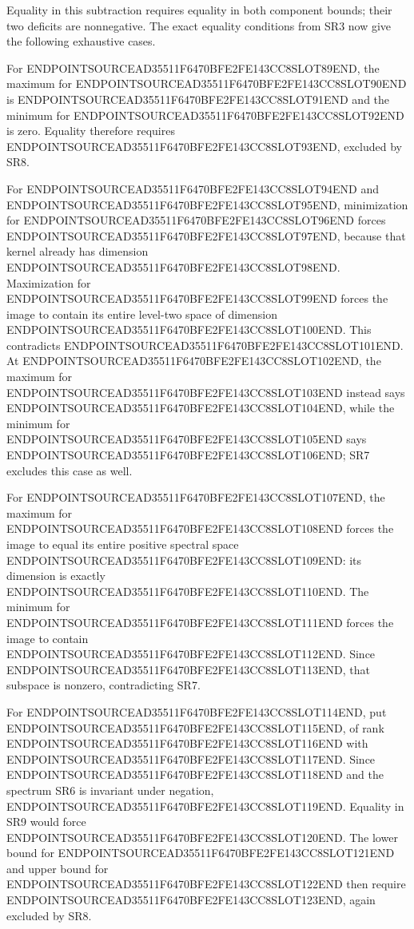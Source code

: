 Equality in this subtraction requires equality in both component bounds; their two deficits are nonnegative. The exact equality conditions from SR3 now give the following exhaustive cases.

For ENDPOINTSOURCEAD35511F6470BFE2FE143CC8SLOT89END, the maximum for ENDPOINTSOURCEAD35511F6470BFE2FE143CC8SLOT90END is ENDPOINTSOURCEAD35511F6470BFE2FE143CC8SLOT91END and the minimum for ENDPOINTSOURCEAD35511F6470BFE2FE143CC8SLOT92END is zero. Equality therefore requires ENDPOINTSOURCEAD35511F6470BFE2FE143CC8SLOT93END, excluded by SR8.

For ENDPOINTSOURCEAD35511F6470BFE2FE143CC8SLOT94END and ENDPOINTSOURCEAD35511F6470BFE2FE143CC8SLOT95END, minimization for ENDPOINTSOURCEAD35511F6470BFE2FE143CC8SLOT96END forces ENDPOINTSOURCEAD35511F6470BFE2FE143CC8SLOT97END, because that kernel already has dimension ENDPOINTSOURCEAD35511F6470BFE2FE143CC8SLOT98END. Maximization for ENDPOINTSOURCEAD35511F6470BFE2FE143CC8SLOT99END forces the image to contain its entire level-two space of dimension ENDPOINTSOURCEAD35511F6470BFE2FE143CC8SLOT100END. This contradicts ENDPOINTSOURCEAD35511F6470BFE2FE143CC8SLOT101END. At ENDPOINTSOURCEAD35511F6470BFE2FE143CC8SLOT102END, the maximum for ENDPOINTSOURCEAD35511F6470BFE2FE143CC8SLOT103END instead says ENDPOINTSOURCEAD35511F6470BFE2FE143CC8SLOT104END, while the minimum for ENDPOINTSOURCEAD35511F6470BFE2FE143CC8SLOT105END says ENDPOINTSOURCEAD35511F6470BFE2FE143CC8SLOT106END; SR7 excludes this case as well.

For ENDPOINTSOURCEAD35511F6470BFE2FE143CC8SLOT107END, the maximum for ENDPOINTSOURCEAD35511F6470BFE2FE143CC8SLOT108END forces the image to equal its entire positive spectral space ENDPOINTSOURCEAD35511F6470BFE2FE143CC8SLOT109END: its dimension is exactly ENDPOINTSOURCEAD35511F6470BFE2FE143CC8SLOT110END. The minimum for ENDPOINTSOURCEAD35511F6470BFE2FE143CC8SLOT111END forces the image to contain ENDPOINTSOURCEAD35511F6470BFE2FE143CC8SLOT112END. Since ENDPOINTSOURCEAD35511F6470BFE2FE143CC8SLOT113END, that subspace is nonzero, contradicting SR7.

For ENDPOINTSOURCEAD35511F6470BFE2FE143CC8SLOT114END, put ENDPOINTSOURCEAD35511F6470BFE2FE143CC8SLOT115END, of rank ENDPOINTSOURCEAD35511F6470BFE2FE143CC8SLOT116END with ENDPOINTSOURCEAD35511F6470BFE2FE143CC8SLOT117END. Since ENDPOINTSOURCEAD35511F6470BFE2FE143CC8SLOT118END and the spectrum SR6 is invariant under negation, ENDPOINTSOURCEAD35511F6470BFE2FE143CC8SLOT119END. Equality in SR9 would force ENDPOINTSOURCEAD35511F6470BFE2FE143CC8SLOT120END. The lower bound for ENDPOINTSOURCEAD35511F6470BFE2FE143CC8SLOT121END and upper bound for ENDPOINTSOURCEAD35511F6470BFE2FE143CC8SLOT122END then require ENDPOINTSOURCEAD35511F6470BFE2FE143CC8SLOT123END, again excluded by SR8.

